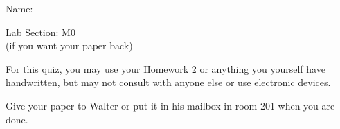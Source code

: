 \documentclass[12pt]{article}
\begin{document}
\Large
\centerline{}

\begin{minipage}{0.6\textwidth}
	\Large
	Name: \underline{\hspace{3in}}
\end{minipage}
\begin{minipage}{0.4\textwidth}
	\Large
	Lab Section: M0\underline{\hspace{1in}}\\
	\small (if you want your paper back)
\end{minipage}

\normalsize

For this quiz, you may use your Homework 2 or anything you yourself have handwritten, but may not consult with anyone else or use electronic devices.

Give your paper to Walter or put it in his mailbox in room 201 when you are done.
\end{document}
